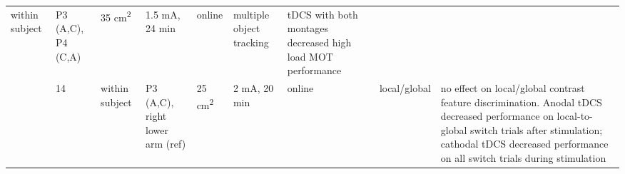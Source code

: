 \documentclass[11pt,]{memoir}
\begin{document}
\begin{longtable}[]{@{}lllllllll@{}}
\begin{minipage}[t]{0.05\columnwidth}
within
subject\strut
\end{minipage} & \begin{minipage}[t]{0.12\columnwidth}\raggedright
P3 (A,C), P4 (C,A)\strut
\end{minipage} & \begin{minipage}[t]{0.04\columnwidth}\raggedright
35
cm\textsuperscript{2}\strut
\end{minipage} & \begin{minipage}[t]{0.05\columnwidth}\raggedright
1.5
mA, 24
min\strut
\end{minipage} & \begin{minipage}[t]{0.05\columnwidth}\raggedright
online\strut
\end{minipage} & \begin{minipage}[t]{0.08\columnwidth}\raggedright
multiple
object
tracking\strut
\end{minipage} & \begin{minipage}[t]{0.27\columnwidth}\raggedright
tDCS with both montages decreased high load MOT
performance\strut
\end{minipage}\tabularnewline
\begin{minipage}[t]{0.08\columnwidth}\raggedright
\textcite{Stone2009}\strut
\end{minipage} & \begin{minipage}[t]{0.03\columnwidth}\raggedright
14\strut
\end{minipage} & \begin{minipage}[t]{0.05\columnwidth}\raggedright
within
subject\strut
\end{minipage} & \begin{minipage}[t]{0.12\columnwidth}\raggedright
P3 (A,C), right
lower arm (ref)\strut
\end{minipage} & \begin{minipage}[t]{0.04\columnwidth}\raggedright
25
cm\textsuperscript{2}\strut
\end{minipage} & \begin{minipage}[t]{0.05\columnwidth}\raggedright
2 mA,
20 min\strut
\end{minipage} & \begin{minipage}[t]{0.05\columnwidth}\raggedright
online\strut
\end{minipage} & \begin{minipage}[t]{0.08\columnwidth}\raggedright
local/global\strut
\end{minipage} & \begin{minipage}[t]{0.27\columnwidth}\raggedright
no effect on local/global contrast feature
discrimination. Anodal tDCS decreased performance
on local-to-global switch trials after
stimulation; cathodal tDCS decreased performance
on all switch trials during stimulation\strut
\end{minipage}\tabularnewline
\bottomrule
\end{longtable}
\end{document}
